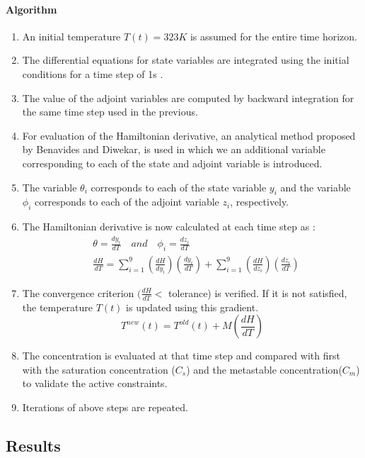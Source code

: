 \paragraph{Algorithm}
\begin{enumerate}
\item An initial temperature $T(t) = 323 K$ is assumed for the entire time horizon.
\item The differential equations for state variables are integrated using the initial conditions for a time step of 1s .
\item The value of the adjoint variables are computed by backward integration for the same time step used in the previous.
\item For evaluation of the Hamiltonian derivative, an analytical method proposed by Benavides and Diwekar\cite{benavides},  is used in which we an additional variable corresponding to each of the state and adjoint variable is introduced.
\item The variable $\theta_{i}$ corresponds to each of the state variable $y_{i}$ and the variable $\phi_{i}$ corresponds to each of the adjoint variable $z_{i}$, respectively.
\item The Hamiltonian derivative is now calculated at each time step  as :
\begin{align}
&\theta = \frac{dy_{i}}{dT} \quad and \quad \phi_{i} = \frac{dz_{i}}{dT} \\
&\frac{dH}{dT} = \sum_{i=1}^{9} \left( \frac{dH}{dy_{i}}\right)\left(	\frac{dy_{i}}{dT} \right) + \sum_{i=1}^{9} \left(\frac{dH}{dz_{i}}\right)\left(\frac{dz_{i}}{dT} \right)
\end{align}
\item The  convergence criterion $(\frac{dH}{dT}<$ tolerance) is verified. If it is not satisfied, the temperature $T(t)$ is updated using this gradient\cite{yenkie}.
\begin{equation}
T^{new}(t) = T^{old}(t) + M\left(\frac{dH}{dT} \right)
\end{equation}
\item The concentration is evaluated  at that time step and compared with first with the saturation concentration ($C_{s}$) and the metastable concentration($C_{m}$) to validate the active constraints.
\item Iterations of above steps are repeated.
\end{enumerate}


\subsection{Results}

